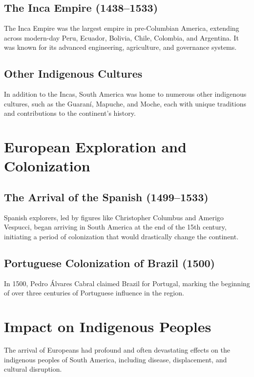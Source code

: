 \documentclass[a4paper,12pt]{book}
\begin{document}
\subsection{The Inca Empire (1438–1533)}
\label{subsec:inca-empire}
The Inca Empire was the largest empire in pre-Columbian America, extending across modern-day Peru, Ecuador, Bolivia, Chile, Colombia, and Argentina. It was known for its advanced engineering, agriculture, and governance systems.

\subsection{Other Indigenous Cultures}
\label{subsec:other-indigenous-cultures}
In addition to the Incas, South America was home to numerous other indigenous cultures, such as the Guaraní, Mapuche, and Moche, each with unique traditions and contributions to the continent’s history.

\section{European Exploration and Colonization}
\label{sec:european-exploration-colonization}

\subsection{The Arrival of the Spanish (1499–1533)}
\label{subsec:arrival-spanish}
Spanish explorers, led by figures like Christopher Columbus and Amerigo Vespucci, began arriving in South America at the end of the 15th century, initiating a period of colonization that would drastically change the continent.

\subsection{Portuguese Colonization of Brazil (1500)}
\label{subsec:portuguese-colonization-brazil}
In 1500, Pedro Álvares Cabral claimed Brazil for Portugal, marking the beginning of over three centuries of Portuguese influence in the region.

\section{Impact on Indigenous Peoples}
\label{sec:impact-indigenous-peoples}
The arrival of Europeans had profound and often devastating effects on the indigenous peoples of South America, including disease, displacement, and cultural disruption.
\end{document}
